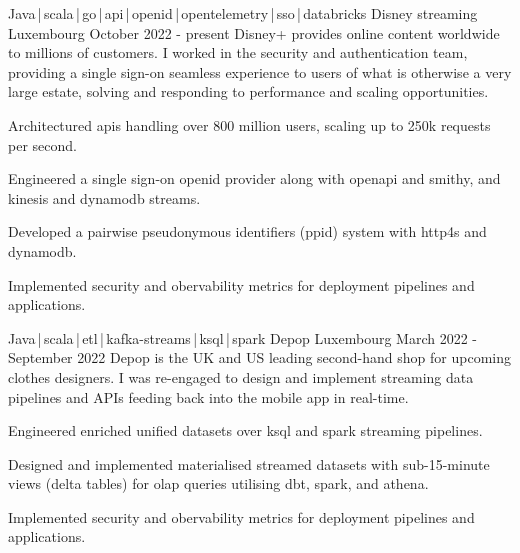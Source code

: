 
\newcommand*{\logo}[2]{\raisebox{-0.2em}{\texttt{[image: \#2]}}\hspace{0.25em}#1}
\newcommand*{\logoonly}[1]{\raisebox{-0.2em}{\texttt{[image: \#1]}}}

\begin{cventries}
    \cventry
    {Java\,|\,scala\,|\,go\,|\,api\,|\,openid\,|\,opentelemetry\,|\,sso\,|\,databricks}
    {\logo{Disney streaming}{../../../images/disney.png}} 
    {Luxembourg}
    {October 2022 - present}
    {Disney+ provides online content worldwide to millions of customers. I worked in the security and authentication team, providing a single sign-on seamless experience to users of what is otherwise a very large estate, solving and responding to performance and scaling opportunities.}
    {
        \begin{cvitems}
            \item{Architectured apis handling over 800 million users, scaling up to 250k requests per second.}
            \item{Engineered a single sign-on openid provider along with openapi and smithy, and kinesis and dynamodb streams.}
            \item{Developed a pairwise pseudonymous identifiers (ppid) system with http4s and dynamodb.}
            \item{Implemented security and obervability metrics for deployment pipelines and applications.}
        \end{cvitems}
    }

    \cventry
    {Java\,|\,scala\,|\,etl\,|\,kafka-streams\,|\,ksql\,|\,spark}
    {\logo{Depop}{../../../images/depop.jpg}} 
    {Luxembourg}
    {March 2022 - September 2022}
    {Depop is the UK and US leading second-hand shop for upcoming clothes designers. I was re-engaged to design and implement streaming data pipelines and APIs feeding back into the mobile app in real-time.}
    {
        \begin{cvitems}
            \item{Engineered enriched unified datasets over ksql and spark streaming pipelines.}
            \item{Designed and implemented materialised streamed datasets with sub-15-minute views (delta tables) for olap queries utilising dbt, spark, and athena.}
            \item{Implemented security and obervability metrics for deployment pipelines and applications.}
        \end{cvitems}
    }


\end{cventries}

